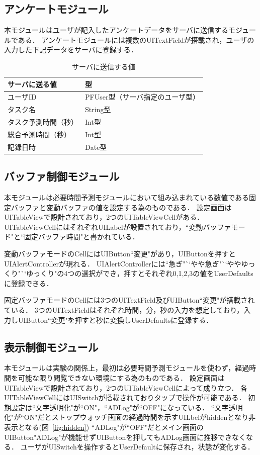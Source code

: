 \subsection{アンケートモジュール}
本モジュールはユーザが記入したアンケートデータをサーバに送信するモジュールである．
アンケートモジュールには複数のUITextFieldが搭載され，ユーザの入力した下記データをサーバに登録する．
\begin{table}[htb]
\begin{center}
  \begin{tabular}{|l|l|} \hline
    サーバに送る値 & 型 \\ \hline
    ユーザID & PFUser型（サーバ指定のユーザ型） \\
    タスク名 & String型 \\
    タスク予測時間（秒） & Int型 \\
    総合予測時間（秒） & Int型 \\
    記録日時 & Date型 \\
	\hline
  \end{tabular}
  \caption{サーバに送信する値}
  \label{tb:serverdata2}
\end{center}
\end{table}

\subsection{バッファ制御モジュール}
本モジュールは必要時間予測モジュールにおいて組み込まれている数値である固定バッファと変動バッファの値を設定する為のものである．
設定画面はUITableViewで設計されており，2つのUITableViewCellがある．
UITableViewCellにはそれぞれUILabelが設置されており，``変動バッファモード"と``固定バッファ時間"と書かれている．

変動バッファモードのCellにはUIButton``変更"があり，UIButtonを押すとUIAlertControllerが現れる．
UIAlertControllerには``急ぎ"``やや急ぎ"``ややゆっくり"``ゆっくり"の4つの選択ができ，押すとそれぞれ0,1,2,3の値をUserDefaultsに登録できる．

固定バッファモードのCellには3つのUITextField及びUIButton``変更"が搭載されている．
3つのUITextFieldはそれぞれ時間，分，秒の入力を想定しており，入力しUIButton``変更"を押すと秒に変換しUserDefaultsに登録する．

\subsection{表示制御モジュール}  
本モジュールは実験の関係上，最初は必要時間予測モジュールを使わず，経過時間を可能な限り閲覧できない環境にする為のものである．
設定画面はUITableViewで設計されており，2つのUITableViewCellによって成り立つ．
各UITableViewCellにはUISwitchが搭載されておりタップで操作が可能である．
初期設定は``文字透明化"が``ON"，``ADLog"が``OFF"になっている．
``文字透明化"が``ON"だとストップウォッチ画面の経過時間を示すUILbelがhiddenとなり非表示となる(図~\ref{fig:hidden})
``ADLog"が``OFF"だとメイン画面のUIButton"ADLog"が機能せずUIButtonを押してもADLog画面に推移できなくなる．
ユーザがUISwitchを操作するとUserDefaultに保存され，状態が変化する．

